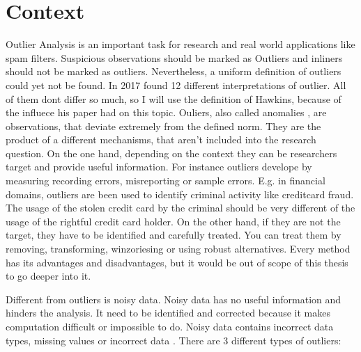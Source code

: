 \section{Context}
Outlier Analysis is an important task for research and real world applications like spam filters.
Suspicious observations should be marked as Outliers and inliners should not be marked as outliers. 
Nevertheless, a uniform definition of outliers could yet not be found. In 2017 \citet{ayadi2017outlier} found 12 different interpretations of outlier.
All of them dont differ so much, so I will use the definition of Hawkins, because of the influece his paper had on this topic.
Ouliers, also called anomalies \citep{chandola2009anomaly}, are observations, that deviate extremely from the defined norm.
They are the product of a different mechanisms, that aren't included into the research question. \citep{hawkins1980identification}
On the one hand, depending on the context they can be researchers target and provide useful information.
For instance outliers develope by measuring recording errors, misreporting or sample errors.
E.g. in financial domains, outliers are been used to identify criminal activity like creditcard fraud. 
The usage of the stolen credit card by the criminal should be very different of the usage of the rightful credit card holder. \citep{rezapour2019anomaly}
On the other hand, if they are not the target, they have to be identified and carefully treated. \citep{smiti2020critical}
You can treat them by removing, transforming, winzoriesing or using robust alternatives.
Every method has its advantages and disadvantages, but it would be out of scope of this thesis to go deeper into it. 


Different from outliers is noisy data.
Noisy data has no useful information and hinders the analysis. 
It need to be identified and corrected because it makes computation difficult or impossible to do.
Noisy data contains incorrect data types, missing values or incorrect data \citep{smiti2020critical}.
There are 3 different types of outliers: 


